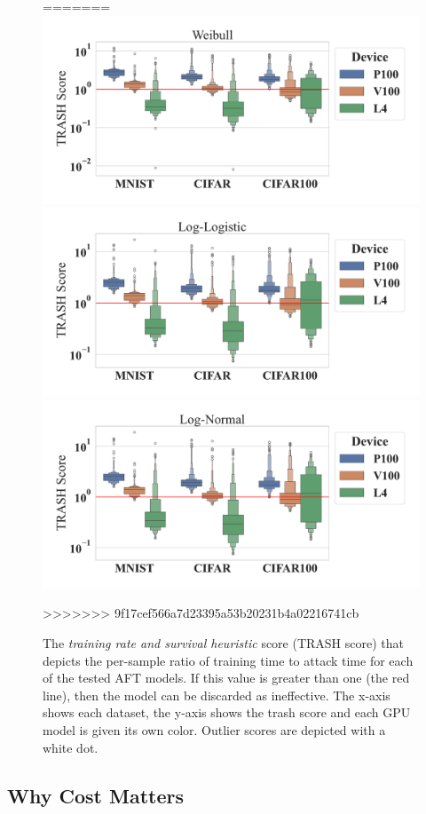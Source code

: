 \documentclass[sn-mathphys-num]{sn-jnl}%
\begin{document}
\begin{figure}[tph!]
=======
        \includegraphics[width=.49\linewidth]{plots/combined/weibull_trash_score.pdf}
        \includegraphics[width=.49\linewidth]{plots/combined/log_logistic_trash_score.pdf}
        \includegraphics[width=.49\linewidth]{plots/combined/log_normal_trash_score.pdf}
    \caption{The \textit{training rate and survival heuristic} score (TRASH score) that depicts the per-sample ratio of training time to attack time for each of the tested AFT models. 
    If this value is greater than one (the red line), then the model can be discarded as ineffective. The x-axis shows each dataset, the y-axis shows the \acrshort{trash} score and each GPU model is given its own color. Outlier scores are depicted with a white dot.}
>>>>>>> 9f17cef566a7d23395a53b20231b4a02216741cb
    \label{fig:trash}
\end{figure}

\subsection{Why Cost Matters}
\end{document}
